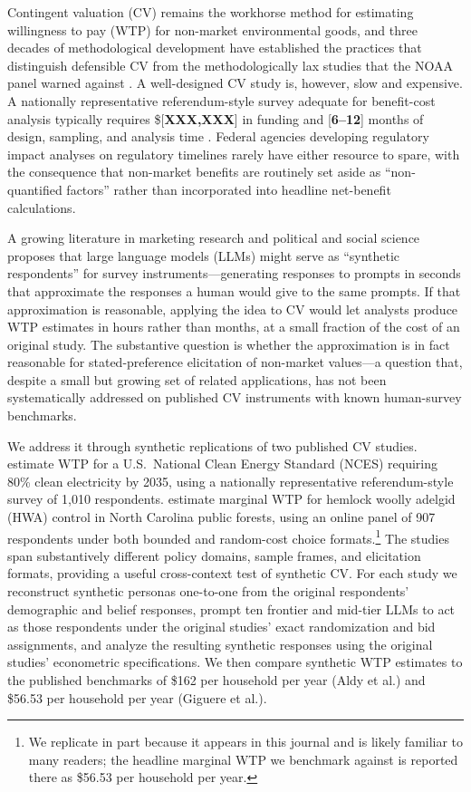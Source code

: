 \documentclass[12pt]{article}
\begin{document}
Contingent valuation (CV) remains the workhorse method for estimating
willingness to pay (WTP) for non-market environmental goods, and three decades
of methodological development have established the practices that distinguish
defensible CV from the methodologically lax studies that the NOAA panel
warned against \parencite{Arrow1993, Johnston2017}. A well-designed CV study
is, however, slow and expensive. A nationally representative
referendum-style survey adequate for benefit-cost analysis typically requires
\$[\textbf{XXX,XXX}] in funding and [\textbf{6--12}] months of design,
sampling, and analysis time \parencite{Johnston2017, Champ2017}. Federal
agencies developing regulatory impact analyses on regulatory timelines
rarely have either resource to spare, with the consequence that non-market
benefits are routinely set aside as ``non-quantified factors'' rather than
incorporated into headline net-benefit calculations.

A growing literature in marketing research \parencite{Brand2024, Li2024} and
political and social science \parencite{Argyle2023, Bisbee2024, Horton2023}
proposes that large language models (LLMs) might serve as
``synthetic respondents'' for survey instruments---generating responses to
prompts in seconds that approximate the responses a human would give to the
same prompts. If that approximation is reasonable, applying the idea to CV
would let analysts produce WTP estimates in hours rather than months, at a
small fraction of the cost of an original study. The substantive question is
whether the approximation is in fact reasonable for stated-preference
elicitation of non-market values---a question that, despite a small but
growing set of related applications, has not been systematically addressed
on published CV instruments with known human-survey benchmarks.

We address it through synthetic replications of two published CV studies.
\textcite{Aldy2012} estimate WTP for a U.S.\ National Clean Energy Standard
(NCES) requiring 80\% clean electricity by 2035, using a nationally
representative referendum-style survey of 1{,}010 respondents.
\textcite{Giguere2020} estimate marginal WTP for hemlock woolly adelgid
(HWA) control in North Carolina public forests, using an online panel of
907 respondents under both bounded and random-cost choice formats.\footnote{We
replicate \textcite{Giguere2020} in part because it appears in this journal
and is likely familiar to many readers; the headline marginal WTP we
benchmark against is reported there as \$56.53 per household per year.}
The studies span substantively different policy domains, sample frames, and
elicitation formats, providing a useful cross-context test of synthetic CV.
For each study we reconstruct synthetic personas one-to-one from the
original respondents' demographic and belief responses, prompt ten frontier
and mid-tier LLMs to act as those respondents under the original studies'
exact randomization and bid assignments, and analyze the resulting synthetic
responses using the original studies' econometric specifications. We then
compare synthetic WTP estimates to the published benchmarks of \$162 per
household per year (Aldy et al.) and \$56.53 per household per year (Giguere
et al.).
\end{document}
